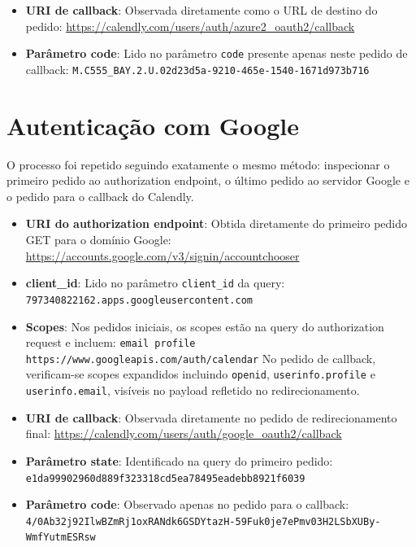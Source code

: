 \begin{itemize}
  \item \textbf{URI de callback}:  
  Observada diretamente como o URL de destino do pedido:  
  \url{https://calendly.com/users/auth/azure2_oauth2/callback}

  \item \textbf{Parâmetro code}:  
  Lido no parâmetro \texttt{code} presente apenas neste pedido de callback:  
  \texttt{M.C555\_BAY.2.U.02d23d5a-9210-465e-1540-1671d973b716}
\end{itemize}

\section{Autenticação com Google}

O processo foi repetido seguindo exatamente o mesmo método: inspecionar o primeiro pedido ao
authorization endpoint, o último pedido ao servidor Google e o pedido para o callback do Calendly.

\begin{itemize}
  \item \textbf{URI do authorization endpoint}:  
  Obtida diretamente do primeiro pedido GET para o domínio Google:  
  \url{https://accounts.google.com/v3/signin/accountchooser}

  \item \textbf{client\_id}:  
  Lido no parâmetro \texttt{client\_id} da query:  
  \texttt{797340822162.apps.googleusercontent.com}

  \item \textbf{Scopes}:  
  Nos pedidos iniciais, os scopes estão na query do authorization request e incluem:  
  \texttt{email profile https://www.googleapis.com/auth/calendar}  
  No pedido de callback, verificam-se scopes expandidos incluindo \texttt{openid},
  \texttt{userinfo.profile} e \texttt{userinfo.email}, visíveis no payload refletido no redirecionamento.

  \item \textbf{URI de callback}:  
  Observada diretamente no pedido de redirecionamento final:  
  \url{https://calendly.com/users/auth/google_oauth2/callback}

  \item \textbf{Parâmetro state}:  
  Identificado na query do primeiro pedido:  
  \texttt{e1da99902960d889f323318cd5ea78495eadebb8921f6039}

  \item \textbf{Parâmetro code}:  
  Observado apenas no pedido para o callback:  
  \texttt{4/0Ab32j92IlwBZmRj1oxRANdk6GSDYtazH-59Fuk0je7ePmv03H2LSbXUBy-WmfYutmESRsw}
\end{itemize}

